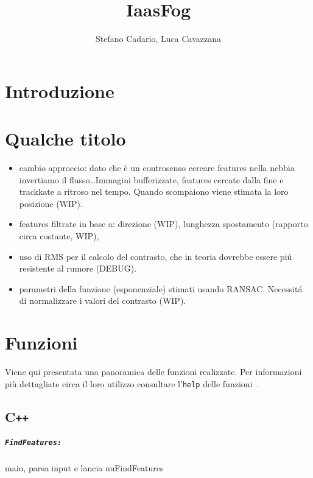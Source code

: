 \documentclass[12pt]{report}
\title {IaasFog}
\author{Stefano Cadario, Luca Cavazzana}
\begin{document}
\maketitle

\tableofcontents

\chapter{Introduzione}

\chapter{Qualche titolo}
\begin{itemize}
	\item cambio approccio: dato che \`e un controsenso cercare features nella nebbia invertiamo il flusso\dots Immagini bufferizzate, features cercate dalla fine e trackkate a ritroso nel tempo. Quando scompaiono viene stimata la loro posizione (WIP).
	
	\item features filtrate in base a: direzione (WIP), lunghezza spostamento (rapporto circa costante, WIP), 
	
	\item uso di RMS per il calcolo del contrasto, che in teoria dovrebbe essere pi\'u resistente al rumore (DEBUG).
	
	\item  parametri della funzione (esponenziale) stimati usando RANSAC. Necessit\'a di normalizzare i valori del contrasto (WIP).
\end{itemize}

\chapter{Funzioni}

Viene qui presentata una panoramica delle funzioni realizzate. Per informazioni pi\`u dettagliate circa il loro utilizzo consultare l'\verb|help| delle funzioni~\cite{lucaskanade81}.

\section[C++]{C\verb_++_}

\paragraph*{\verb_FindFeatures:_} main, parsa input e lancia nuFindFeatures
\end{document}
